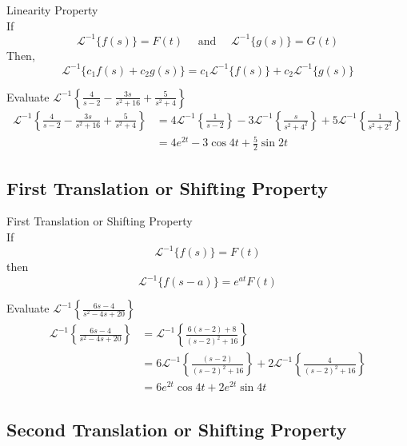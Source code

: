 \documentclass[12pt]{article}
\newcommand{\Lapinv}{\mathscr{L}^{-1}}
\begin{document}
\begin{theorem}{Linearity Property}{}
    \\If \[
        \Lapinv \{ f(s) \} = F(t) \quad \text{ and } \quad
        \Lapinv \{ g(s) \} = G(t)
    \] Then, \[
        \Lapinv \{ c_1f(s) + c_2g(s) \} = c_1 \Lapinv \{ f(s) \} + c_2 \Lapinv \{ g(s) \}
    \]
\end{theorem}

\begin{example}{Evaluate $\Lapinv \left\{ \frac{4}{s-2} - \frac{3s}{s^2+16} + \frac{5}{s^2+4} \right\}$}{}
    \begin{align*}
        \Lapinv \left\{ \frac{4}{s-2} - \frac{3s}{s^2+16} + \frac{5}{s^2+4} \right\} &= 4\Lapinv \left\{ \frac{1}{s-2} \right\} - 3\Lapinv \left\{ \frac{s}{s^2+4^2} \right\} + 5\Lapinv \left\{ \frac{1}{s^2+2^2} \right\} \\
        &= 4e^{2t} - 3\cos{4t} + \frac{5}{2}\sin{2t}
    \end{align*}
\end{example}


\subsection{First Translation or Shifting Property}

\begin{theorem}{First Translation or Shifting Property}{}
    \\If \[
        \Lapinv \{ f(s) \} = F(t)
    \] then \[
        \Lapinv \{ f(s-a) \} = e^{at}F(t)
    \]
\end{theorem}

\begin{example}{Evaluate $\displaystyle \Lapinv \left\{ \frac{6s-4}{s^2-4s+20} \right\}$}{}
    \begin{align*}
        \Lapinv \left\{ \frac{6s-4}{s^2-4s+20} \right\} &= \Lapinv \left\{ \frac{6(s-2)+8}{(s-2)^2+16} \right\} \\
        &= 6\Lapinv \left\{ \frac{(s-2)}{(s-2)^2+16} \right\} + 2\Lapinv \left\{ \frac{4}{(s-2)^2+16} \right\} \\
        &= 6e^{2t}\cos{4t} + 2e^{2t}\sin{4t}
    \end{align*}
\end{example}


\subsection{Second Translation or Shifting Property}
\end{document}
